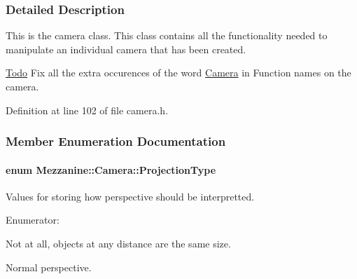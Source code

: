 \subsubsection{Detailed Description}
This is the camera class. This class contains all the functionality needed to manipulate an individual camera that has been created. \begin{Desc}
\item[\hyperlink{todo__todo000003}{Todo}]Fix all the extra occurences of the word \hyperlink{classMezzanine_1_1Camera}{Camera} in Function names on the camera. \end{Desc}


Definition at line 102 of file camera.h.



\subsubsection{Member Enumeration Documentation}
\hypertarget{classMezzanine_1_1Camera_a643bf90630796bca5353967664d5f6e3}{
\paragraph[{ProjectionType}]{\setlength{\rightskip}{0pt plus 5cm}enum {\bf Mezzanine::Camera::ProjectionType}}\hfill}
\label{classMezzanine_1_1Camera_a643bf90630796bca5353967664d5f6e3}


Values for storing how perspective should be interpretted. 

\begin{Desc}
\item[Enumerator: ]\par
\begin{description}
\item[{\em 
\hypertarget{classMezzanine_1_1Camera_a643bf90630796bca5353967664d5f6e3a5bf29bb9ff44080ae6cbfa3e2aeb467c}{
Orthographic}
\label{classMezzanine_1_1Camera_a643bf90630796bca5353967664d5f6e3a5bf29bb9ff44080ae6cbfa3e2aeb467c}
}]Not at all, objects at any distance are the same size. \item[{\em 
\hypertarget{classMezzanine_1_1Camera_a643bf90630796bca5353967664d5f6e3a616794ef1e113f63b1b9bf6896c61eba}{
Perspective}
\label{classMezzanine_1_1Camera_a643bf90630796bca5353967664d5f6e3a616794ef1e113f63b1b9bf6896c61eba}
}]Normal perspective. \end{description}
\end{Desc}



